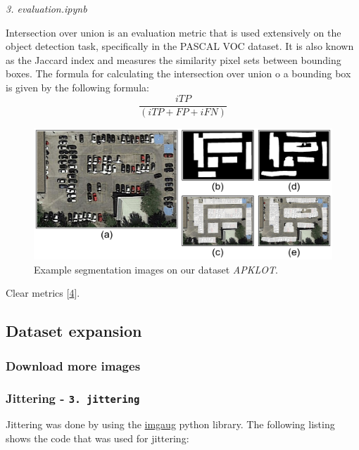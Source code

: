 \documentclass[]{article}
\theoremstyle{definition}
\theoremstyle{definition}
\theoremstyle{definition}
\theoremstyle{remark}
\begin{document}
\emph{3. evaluation.ipynb}

Intersection over union is an evaluation metric that is used extensively
on the object detection task, specifically in the PASCAL VOC dataset. It
is also known as the Jaccard index and measures the similarity pixel
sets between bounding boxes. The formula for calculating the
intersection over union o a bounding box is given by the following
formula: \[
\frac{iTP}{(iTP+FP+iFN)}
\]

\begin{figure}

{\centering \includegraphics[width=0.65\linewidth]{images/segmentation_examples/seg} 

}

\caption{Example segmentation images on our dataset \emph{APKLOT}. }\label{fig:fig3}
\end{figure}

Clear metrics {[}\protect\hyperlink{ref-stiefelhagen2006clear}{4}{]}.

\hypertarget{dataset-expansion}{%
\subsection{Dataset expansion}\label{dataset-expansion}}

\hypertarget{download-more-images}{%
\subsubsection{Download more images}\label{download-more-images}}

\hypertarget{jittering---3.-jittering}{%
\subsubsection{\texorpdfstring{Jittering -
\texttt{3.\ jittering}}{Jittering - 3. jittering}}\label{jittering---3.-jittering}}

Jittering was done by using the
\href{https://github.com/aleju/imgaug}{imgaug} python library. The
following listing shows the code that was used for jittering:
\end{document}

